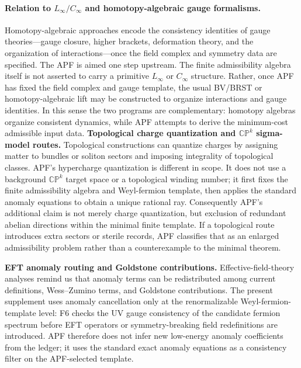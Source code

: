 \documentclass[11pt]{article}
\theoremstyle{definition}
\begin{document}
\paragraph{Relation to $L_\infty/C_\infty$ and homotopy-algebraic gauge formalisms.}\label{par:homotopy_algebra}
Homotopy-algebraic approaches encode the consistency identities of gauge
theories---gauge closure, higher brackets, deformation theory, and the
organization of interactions---once the field complex and symmetry data are
specified.  The APF is aimed one step upstream.  The finite admissibility algebra itself
is not asserted to carry a primitive $L_\infty$ or $C_\infty$ structure.
Rather, once APF has fixed the field complex and gauge template, the usual
BV/BRST or homotopy-algebraic lift may be constructed to organize interactions
and gauge identities.  In this sense the two programs are complementary:
homotopy algebras organize consistent dynamics, while APF attempts to derive
the minimum-cost admissible input data.
\smallskip\noindent\textbf{Topological charge quantization and $\mathbb{CP}^k$ sigma-model routes.}\quad
Topological constructions can quantize charges by assigning matter to bundles or soliton sectors and imposing integrality of topological classes.  APF's hypercharge quantization is different in scope.  It does not use a background $\mathbb{CP}^k$ target space or a topological winding number; it first fixes the finite admissibility algebra and Weyl-fermion template, then applies the standard anomaly equations to obtain a unique rational ray.  Consequently APF's additional claim is not merely charge quantization, but exclusion of redundant abelian directions within the minimal finite template.  If a topological route introduces extra sectors or sterile records, APF classifies that as an enlarged admissibility problem rather than a counterexample to the minimal theorem.

\smallskip\noindent\textbf{EFT anomaly routing and Goldstone contributions.}\quad
Effective-field-theory analyses remind us that anomaly terms can be redistributed among current definitions, Wess--Zumino terms, and Goldstone contributions.  The present supplement uses anomaly cancellation only at the renormalizable Weyl-fermion-template level: F6 checks the UV gauge consistency of the candidate fermion spectrum before EFT operators or symmetry-breaking field redefinitions are introduced.  APF therefore does not infer new low-energy anomaly coefficients from the ledger; it uses the standard exact anomaly equations as a consistency filter on the APF-selected template.
\end{document}
